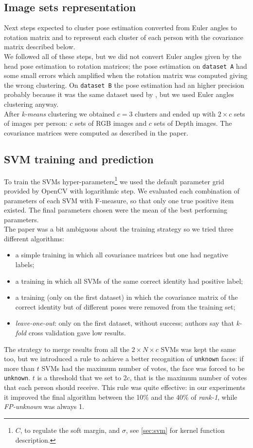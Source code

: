 \documentclass{article}
\begin{document}
\subsection{Image sets representation} \label{sec:covariances}
Next steps expected to cluster pose estimation converted from Euler angles to rotation matrix and to represent each cluster of each person with the covariance matrix described below. \\
We followed all of these steps, but we did not convert Euler angles given by the head pose estimation to rotation matrices; the pose estimation on \verb|dataset A| had some small errors which amplified when the rotation matrix was computed giving the wrong clustering. On \verb|dataset B| the pose estimation had an higher precision probably because it was the same dataset used by \citet{Fanelli2011}, but we used Euler angles clustering anyway.\\
After \textit{k-means} clustering we obtained $c=3$ clusters and ended up with $2\times c$ sets of images per person: $c$ sets of RGB images and $c$ sets of Depth images. The covariance matrices were computed as described in the paper.

\subsection{SVM training and prediction} \label{sec:training}
To train the SVMs hyper-parameters\footnote{$C$, to regulate the soft margin, and $\sigma$, see \ref{sec:svm} for kernel function description.} we used the default parameter grid provided by OpenCV with logarithmic step. We evaluated each combination of parameters of each SVM with F-measure, so that only one true positive item existed. The final parameters chosen were the mean of the best performing parameters. \\
The paper was a bit ambiguous about the training strategy so we tried three different algorithms:
\begin{itemize}
	\item a simple training in which all covariance matrices but one had negative labels;
	\item a training in which all SVMs of the same correct identity had positive label;
	\item a training (only on the first dataset) in which the covariance matrix of the correct identity but of different poses were removed from the training set;
	\item \textit{leave-one-out}: only on the first dataset, without success; authors say that \textit{k-fold} cross validation gave low results.
\end{itemize}
The strategy to merge results from all the $2 \times N \times c$ SVMs was kept the same too, but we introduced a rule to achieve a better recognition of \verb|unknown| faces: if more than $t$ SVMs had the maximum number of votes, the face was forced to be \verb|unknown|. $t$ is a threshold that we set to $2c$, that is the maximum number of votes that each person should receive. This rule was quite effective: in our experiments it improved the final algorithm between the 10\% and the 40\% of \textit{rank-1}, while \textit{FP-unknown} was always 1. \\
\end{document}
